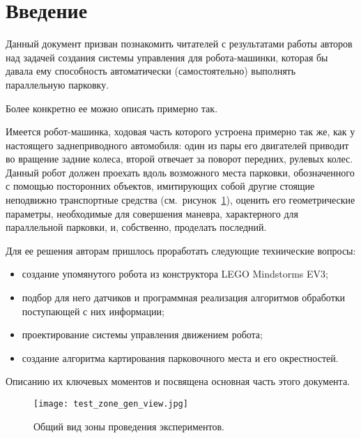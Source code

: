 \newpage
\section*{Введение}
Данный документ призван познакомить читателей с результатами работы авторов над задачей создания системы управления для робота-машинки, которая бы давала ему способность автоматически (самостоятельно) выполнять параллельную парковку.

Более конкретно ее можно описать примерно так.

Имеется робот-машинка, ходовая часть которого устроена примерно так же, как у настоящего заднеприводного автомобиля: один из пары его двигателей приводит во вращение задние колеса, второй отвечает за поворот передних, рулевых колес.
Данный робот должен проехать вдоль возможного места парковки, обозначенного с помощью посторонних объектов, имитирующих собой другие стоящие неподвижно транспортные средства (см.~рисунок~\ref{img_test_zone_gen_view}), оценить его геометрические параметры, необходимые для совершения маневра, характерного для параллельной парковки, и, собственно, проделать последний.

Для ее решения авторам пришлось проработать следующие технические вопросы:
\begin{itemize}
    \item создание упомянутого робота из конструктора LEGO Mindstorms EV3;
    \item подбор для него датчиков и программная реализация алгоритмов обработки поступающей с них информации;
    \item проектирование системы управления движением робота;
    \item создание алгоритма картирования парковочного места и его окрестностей.
\end{itemize}
Описанию их ключевых моментов и посвящена основная часть этого документа.

\begin{figure}[h!]
    \centering
    \texttt{[image: test\_zone\_gen\_view.jpg]}
    \caption{Общий вид зоны проведения экспериментов.}
    \label{img_test_zone_gen_view}
\end{figure}

\newpage \mbox{} \newpage

